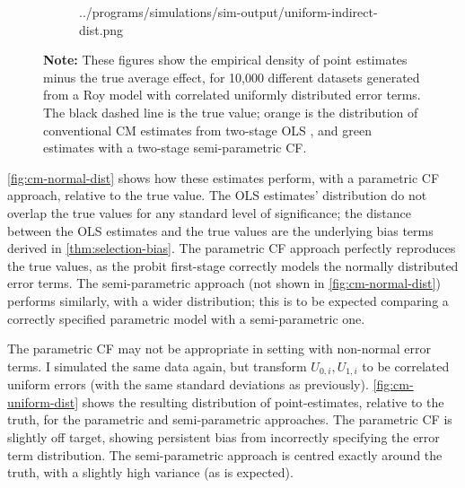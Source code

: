 \begin{figure}[h!]
\begin{subfigure}[c]{0.475\textwidth}
{            ../programs/simulations/sim-output/uniform-indirect-dist.png}
    \end{subfigure}
    \label{fig:cm-uniform-dist}
    \justify
    \footnotesize    
    \textbf{Note:}
    These figures show the empirical density of point estimates minus the true average effect, for 10,000 different datasets generated from a Roy model with correlated uniformly distributed error terms.
    The black dashed line is the true value;
    orange is the distribution of conventional CM estimates from two-stage OLS \citep{imai2010identification},
    and green estimates with a two-stage semi-parametric CF.
\end{figure}

\autoref{fig:cm-normal-dist} shows how these estimates perform, with a parametric CF approach, relative to the true value.
The OLS estimates' distribution do not overlap the true values for any standard level of significance; the distance between the OLS estimates and the true values are the underlying bias terms derived in \autoref{thm:selection-bias}.
The parametric CF approach perfectly reproduces the true values, as the probit first-stage correctly models the normally distributed error terms.
The semi-parametric approach (not shown in \autoref{fig:cm-normal-dist}) performs similarly, with a wider distribution; this is to be expected comparing a correctly specified parametric model with a semi-parametric one.

The parametric CF may not be appropriate in setting with non-normal error terms.
I simulated the same data again, but transform $U_{0,i}, U_{1,i}$ to be correlated uniform errors (with the same standard deviations as previously).
\autoref{fig:cm-uniform-dist} shows the resulting distribution of point-estimates, relative to the truth, for the parametric and semi-parametric approaches.
The parametric CF is slightly off target, showing persistent bias from incorrectly specifying the error term distribution.
The semi-parametric approach is centred exactly around the truth, with a slightly high variance (as is expected).

